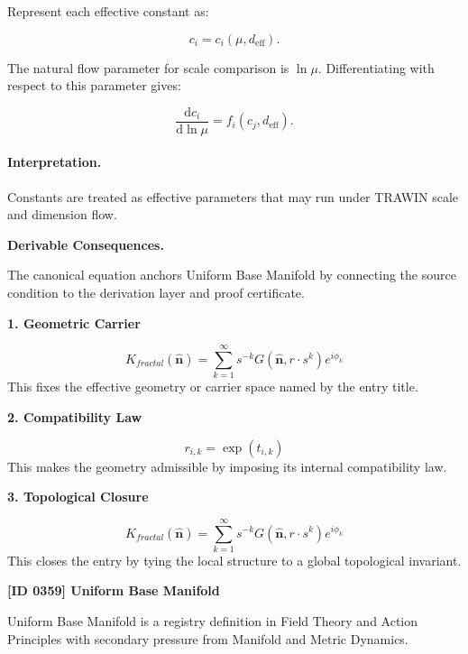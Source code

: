 Represent each effective constant as:

\begin{equation}
c_i=c_i(\mu,d_{\mathrm{eff}}).
\end{equation}

The natural flow parameter for scale comparison is $\ln\mu$.  
Differentiating with respect to this parameter gives:

\begin{equation}
\boxed{
\frac{\mathrm{d}c_i}{\mathrm{d}\ln\mu}
=
f_i(c_j,d_{\mathrm{eff}}).
}
\end{equation}

\paragraph{Interpretation.}
Constants are treated as effective parameters that may run under TRAWIN scale and dimension flow.

\par\vspace{0.35em}
\noindent\textbf{Derivable Consequences.}\quad
\begingroup
\footnotesize
\raggedright
The canonical equation anchors Uniform Base Manifold by connecting the source condition to the derivation layer and proof certificate.
\par\endgroup

\noindent\textbf{1. Geometric Carrier}\par
\[
K_{fractal}(\hat{\mathbf{n}}) = \sum_{k=1}^{\infty} s^{-k} G(\hat{\mathbf{n}}, r \cdot s^k) e^{i\phi_k}
\]
\noindent This fixes the effective geometry or carrier space named by the entry title.\par
\noindent\textbf{2. Compatibility Law}\par
\[
r_{i,k} = \exp(t_{i,k})
\]
\noindent This makes the geometry admissible by imposing its internal compatibility law.\par
\noindent\textbf{3. Topological Closure}\par
\[
K_{fractal}(\hat{\mathbf{n}}) = \sum_{k=1}^{\infty} s^{-k} G(\hat{\mathbf{n}}, r \cdot s^k) e^{i\phi_k}
\]
\noindent This closes the entry by tying the local structure to a global topological invariant.\par

\clearpage
\noindent\textbf{[ID 0359] Uniform Base Manifold}\par
\vspace{0.35em}
\begingroup\small
{}
Uniform Base Manifold is a registry definition in Field Theory and Action Principles with secondary pressure from Manifold and Metric Dynamics.

